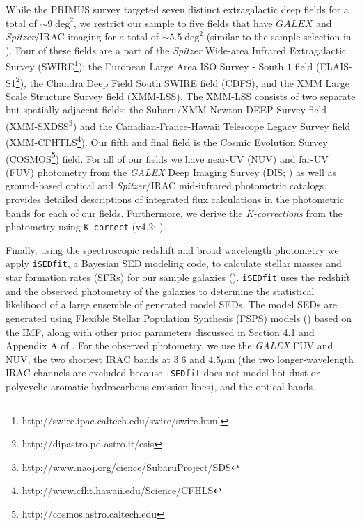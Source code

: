 \documentclass{emulateapj}
\begin{document}
While the PRIMUS survey targeted seven distinct extragalactic deep fields for a total of $\sim 9 \; \mathrm{deg}^2$, we restrict our sample to five fields that have $GALEX$ and {\em Spitzer}/IRAC imaging for a total of $\sim 5.5 \; \mathrm{deg}^2$ (similar to the sample selection in \citealt{Moustakas:2013aa}). Four of these fields are a part of the {\em Spitzer} Wide-area Infrared Extragalactic Survey (SWIRE\footnote{http://swire.ipac.caltech.edu/swire/swire.html}): the European Large Area ISO Survey - South $1$ field (ELAIS-S1\footnote{http://dipastro.pd.astro.it/esis}), the Chandra Deep Field South SWIRE field (CDFS), and the XMM Large Scale Structure Survey field (XMM-LSS). The XMM-LSS consists of two separate but spatially adjacent fields: the Subaru/XMM-Newton DEEP Survey field (XMM-SXDSS\footnote{http://www.naoj.org/cience/SubaruProject/SDS}) and the Canadian-France-Hawaii Telescope Legacy Survey field (XMM-CFHTLS\footnote{http://www.cfht.hawaii.edu/Science/CFHLS}). Our fifth and final field is the Cosmic Evolution Survey (COSMOS\footnote{http://cosmos.astro.caltech.edu}) field. For all of our fields we have near-UV (NUV) and far-UV (FUV) photometry from the {\em GALEX} Deep Imaging Survey (DIS; \citealt{Martin:2005aa, Morrissey:2005aa}) as well as ground-based optical and {\em Spitzer}/IRAC mid-infrared photometric catalogs. \cite{Moustakas:2013aa} provides detailed descriptions of integrated flux calculations in the photometric bands for each of our fields. Furthermore, we derive the {\em K-corrections} from the photometry using \texttt{K-correct} (v4.2; \citealt{Blanton:2007aa}). 

Finally, using the spectroscopic redshift and broad wavelength photometry we apply \texttt{iSEDfit}, a Bayesian SED modeling code, to calculate stellar masses and star formation rates (SFRs) for our sample galaxies (\citealt{Moustakas:2013aa}). \texttt{iSEDfit} uses the redshift and the observed photometry of the galaxies to determine the statistical likelihood of a large ensemble of generated model SEDs. The model SEDs are generated using Flexible Stellar Population Synthesis (FSPS) models (\citealt{Conroy:2010aa}) based on the \cite{Chabrier:2003aa} IMF, along with other prior parameters discussed in Section 4.1 and Appendix A of \cite{Moustakas:2013aa}. For the observed photometry, we use the {\em GALEX} FUV and NUV, the two shortest IRAC bands at $3.6$ and $4.5 \mu \mathrm{m}$ (the two longer-wavelength IRAC channels are excluded because \texttt{iSEDfit} does not model hot dust or polycyclic aromatic hydrocarbons emission lines), and the optical bands. 
\end{document}
